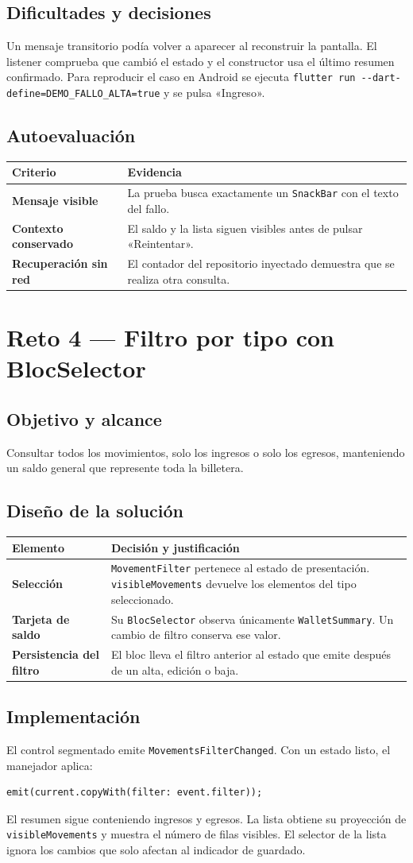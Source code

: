 \documentclass[11pt,letterpaper]{article}
\makeatletter
\newcommand{\tabla}[2]{\par\smallskip\begin{tabularx}{\linewidth}{@{}>{\bfseries\color{vino}}p{.28\linewidth}X@{}}\toprule\rowcolor{rosa}#1\\\midrule #2\bottomrule\end{tabularx}\par}
\newcommand{\ruta}[1]{\nolinkurl{#1}}
\makeatother
\begin{document}
\subsection{Dificultades y decisiones}
Un mensaje transitorio podía volver a aparecer al reconstruir la pantalla. El listener comprueba que cambió el estado y el constructor usa el último resumen confirmado. Para reproducir el caso en Android se ejecuta \ruta{flutter run --dart-define=DEMO_FALLO_ALTA=true} y se pulsa «Ingreso».
\subsection{Autoevaluación}
\tabla{Criterio & Evidencia}{Mensaje visible & La prueba busca exactamente un \texttt{SnackBar} con el texto del fallo.\\Contexto conservado & El saldo y la lista siguen visibles antes de pulsar «Reintentar».\\Recuperación sin red & El contador del repositorio inyectado demuestra que se realiza otra consulta.\\}
\newpage
\section{Reto 4 — Filtro por tipo con BlocSelector}
\subsection{Objetivo y alcance}
Consultar todos los movimientos, solo los ingresos o solo los egresos, manteniendo un saldo general que represente toda la billetera.
\subsection{Diseño de la solución}
\tabla{Elemento & Decisión y justificación}{Selección & \texttt{MovementFilter} pertenece al estado de presentación. \texttt{visibleMovements} devuelve los elementos del tipo seleccionado.\\Tarjeta de saldo & Su \texttt{BlocSelector} observa únicamente \texttt{WalletSummary}. Un cambio de filtro conserva ese valor.\\Persistencia del filtro & El bloc lleva el filtro anterior al estado que emite después de un alta, edición o baja.\\}
\subsection{Implementación}
El control segmentado emite \texttt{MovementsFilterChanged}. Con un estado listo, el manejador aplica:
\begin{verbatim}
emit(current.copyWith(filter: event.filter));
\end{verbatim}
El resumen sigue conteniendo ingresos y egresos. La lista obtiene su proyección de \texttt{visibleMovements} y muestra el número de filas visibles. El selector de la lista ignora los cambios que solo afectan al indicador de guardado.
\end{document}
